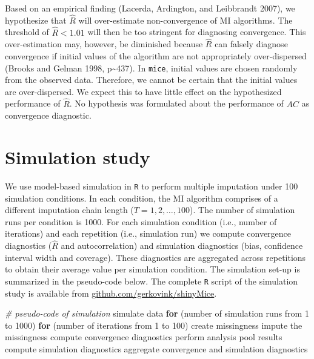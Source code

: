 \documentclass[
  Royal, times, sageapa]{sagej}
\newenvironment{Shaded}{\begin{snugshade}}{\end{snugshade}}
\newcommand{\CommentTok}[1]{\textcolor[rgb]{0.56,0.35,0.01}{\textit{#1}}}
\newcommand{\ControlFlowTok}[1]{\textcolor[rgb]{0.13,0.29,0.53}{\textbf{#1}}}
\newcommand{\DecValTok}[1]{\textcolor[rgb]{0.00,0.00,0.81}{#1}}
\newcommand{\NormalTok}[1]{#1}
\begin{document}
Based on an empirical finding (Lacerda, Ardington, and Leibbrandt 2007),
we hypothesize that \(\widehat{R}\) will over-estimate non-convergence
of MI algorithms. The threshold of \(\widehat{R} < 1.01\) will then be
too stringent for diagnosing convergence. This over-estimation may,
however, be diminished because \(\widehat{R}\) can falsely diagnose
convergence if initial values of the algorithm are not appropriately
over-dispersed (Brooks and Gelman 1998, p\textasciitilde437). In
\texttt{mice}, initial values are chosen randomly from the observed
data. Therefore, we cannot be certain that the initial values are
over-dispersed. We expect this to have little effect on the hypothesized
performance of \(\widehat{R}\). No hypothesis was formulated about the
performance of \(AC\) as convergence diagnostic.

\hypertarget{simulation-study}{%
\section{Simulation study}\label{simulation-study}}

We use model-based simulation in \texttt{R} to perform multiple
imputation under 100 simulation conditions. In each condition, the MI
algorithm comprises of a different imputation chain length
(\(T = 1, 2, \dots, 100\)). The number of simulation runs per condition
is 1000. For each simulation condition (i.e., number of iterations) and
each repetition (i.e., simulation run) we compute convergence
diagnostics (\(\widehat{R}\) and autocorrelation) and simulation
diagnostics (bias, confidence interval width and coverage). These
diagnostics are aggregated across repetitions to obtain their average
value per simulation condition. The simulation set-up is summarized in
the pseudo-code below. The complete \texttt{R} script of the simulation
study is available from
\href{https://github.com/gerkovink/shinyMice/tree/master/3.Thesis/1.SimulationStudy}{github.com/gerkovink/shinyMice}.

\begin{Shaded}
\begin{Highlighting}[]
\CommentTok{# pseudo-code of simulation }
\NormalTok{simulate data }
\ControlFlowTok{for}\NormalTok{ (number of simulation runs from }\DecValTok{1}\NormalTok{ to }\DecValTok{1000}\NormalTok{)}
  \ControlFlowTok{for}\NormalTok{ (number of iterations from }\DecValTok{1}\NormalTok{ to }\DecValTok{100}\NormalTok{)}
\NormalTok{    create missingness}
\NormalTok{    impute the missingness}
\NormalTok{    compute convergence diagnostics}
\NormalTok{    perform analysis}
\NormalTok{    pool results}
\NormalTok{    compute simulation diagnostics}
\NormalTok{aggregate convergence and simulation diagnostics}
\end{Highlighting}
\end{Shaded}
\end{document}
